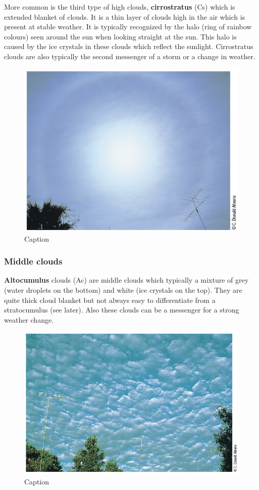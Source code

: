 \documentclass[12pt,oneside]{book}
\begin{document}
More common is the third type of high clouds, \textbf{cirrostratus} (Cs)
which is extended blanket of clouds. It is a thin layer of clouds high
in the air which is present at stable weather. It is typically
recognized by the halo (ring of rainbow colours) seen around the sun
when looking straight at the sun. This halo is caused by the ice
crystals in these clouds which reflect the sunlight. Cirrostratus clouds
are also typically the second messenger of a storm or a change in
weather.

\begin{figure}

{\centering \includegraphics[width=0.8\linewidth]{figures/Figure248} 

}

\caption{Caption}\label{fig:CLOUD3}
\end{figure}

\subsubsection{Middle clouds}\label{middle-clouds}

\textbf{Altocumulus} clouds (Ac) are middle clouds which typically a
mixture of grey (water droplets on the bottom) and white (ice crystals
on the top). They are quite thick cloud blanket but not always easy to
differentiate from a stratocumulus (see later). Also these clouds can be
a messenger for a strong weather change.

\begin{figure}

{\centering \includegraphics[width=0.8\linewidth]{figures/Figure249} 

}

\caption{Caption}\label{fig:CLOUD4}
\end{figure}
\end{document}
